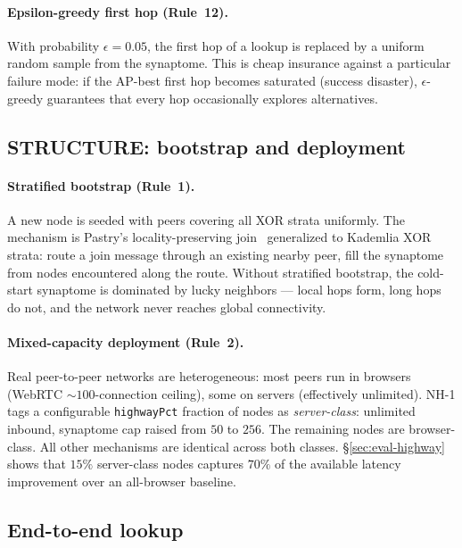 \documentclass[conference]{IEEEtran}
\newcommand{\nhone}{NH-1\xspace}
\begin{document}
\paragraph{Epsilon-greedy first hop (Rule~12).}
With probability $\epsilon = 0.05$, the first hop of a lookup is
replaced by a uniform random sample from the synaptome. This is cheap
insurance against a particular failure mode: if the AP-best first hop
becomes saturated (success disaster), $\epsilon$-greedy guarantees that
every hop occasionally explores alternatives.

\subsection{STRUCTURE: bootstrap and deployment}
\label{sec:nh1-structure}

\paragraph{Stratified bootstrap (Rule~1).}
A new node is seeded with peers covering all XOR strata uniformly. The
mechanism is Pastry's locality-preserving join~\cite{rowstron2001pastry}
generalized to Kademlia XOR strata: route a join message through an
existing nearby peer, fill the synaptome from nodes encountered along
the route. Without stratified bootstrap, the cold-start synaptome is
dominated by lucky neighbors --- local hops form, long hops do not, and
the network never reaches global connectivity.

\paragraph{Mixed-capacity deployment (Rule~2).}
Real peer-to-peer networks are heterogeneous: most peers run in browsers
(WebRTC $\sim\!100$-connection ceiling), some on servers (effectively
unlimited). \nhone tags a configurable \texttt{highwayPct} fraction of
nodes as \emph{server-class}: unlimited inbound, synaptome cap raised
from $50$ to $256$. The remaining nodes are browser-class. All other
mechanisms are identical across both classes. \S\ref{sec:eval-highway}
shows that $15\%$ server-class nodes captures $70\%$ of the available
latency improvement over an all-browser baseline.

\subsection{End-to-end lookup}
\label{sec:nh1-tick}
\end{document}
